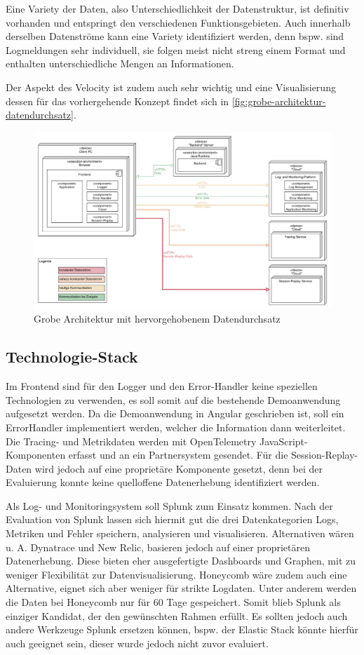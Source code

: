 Eine Variety der Daten, also Unterschiedlichkeit der Datenstruktur, ist definitiv vorhanden und entspringt den verschiedenen Funktionsgebieten. Auch innerhalb derselben Datenströme kann eine Variety identifiziert werden, denn bspw. sind Logmeldungen sehr individuell, sie folgen meist nicht streng einem Format und enthalten unterschiedliche Mengen an Informationen.

Der Aspekt des Velocity ist zudem auch sehr wichtig und eine Visualisierung dessen für das vorhergehende Konzept findet sich in \autoref{fig:grobe-architektur-datendurchsatz}.
	
\begin{figure}[H]
	\centering
	\includegraphics[width=0.75\linewidth]{img/04_erstellung-poc/konzept-datendurchsatz.png}
	\caption{Grobe Architektur mit hervorgehobenem Datendurchsatz}
	\label{fig:grobe-architektur-datendurchsatz}
\end{figure}

\pagebreak

	\subsection{Technologie-Stack}
	\label{sec:technologie-stack}

	Im Frontend sind für den Logger und den Error-Handler keine speziellen Technologien zu verwenden, es soll somit auf die bestehende Demoanwendung aufgesetzt werden. Da die Demoanwendung in Angular geschrieben ist, soll ein ErrorHandler implementiert werden, welcher die Information dann weiterleitet. Die Tracing- und Metrikdaten werden mit OpenTelemetry JavaScript-Komponenten erfasst und an ein Partnersystem gesendet. Für die Session-Replay-Daten wird jedoch auf eine proprietäre Komponente gesetzt, denn bei der Evaluierung konnte keine quelloffene Datenerhebung identifiziert werden.
	
	Als Log- und Monitoringsystem soll Splunk zum Einsatz kommen. Nach der Evaluation von Splunk lassen sich hiermit gut die drei Datenkategorien Logs, Metriken und Fehler speichern, analysieren und visualisieren. Alternativen wären u. A. Dynatrace und New Relic, basieren jedoch auf einer proprietären Datenerhebung. Diese bieten eher ausgefertigte Dashboards und Graphen, mit zu weniger Flexibilität zur Datenvisualisierung. Honeycomb wäre zudem auch eine Alternative, eignet sich aber weniger für strikte Logdaten. Unter anderem werden die Daten bei Honeycomb nur für 60 Tage gespeichert. Somit blieb Splunk als einziger Kandidat, der den gewünschten Rahmen erfüllt. Es sollten jedoch auch andere Werkzeuge Splunk ersetzen können, bspw. der Elastic Stack könnte hierfür auch geeignet sein, dieser wurde jedoch nicht zuvor evaluiert.
	
